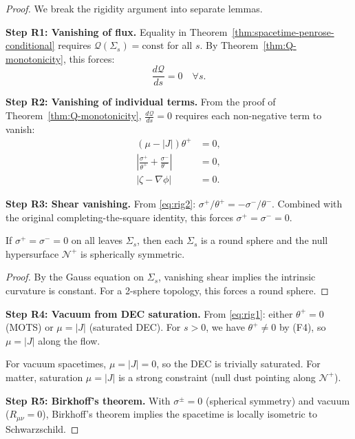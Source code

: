 \begin{proof}
We break the rigidity argument into separate lemmas.

\textbf{Step R1: Vanishing of flux.}
Equality in Theorem~\ref{thm:spacetime-penrose-conditional} requires $\mathcal{Q}(\Sigma_s) = \text{const}$ for all $s$. By Theorem~\ref{thm:Q-monotonicity}, this forces:
\begin{equation}
\frac{d\mathcal{Q}}{ds} = 0 \quad \forall s.
\end{equation}

\textbf{Step R2: Vanishing of individual terms.}
From the proof of Theorem~\ref{thm:Q-monotonicity}, $\frac{d\mathcal{Q}}{ds} = 0$ requires each non-negative term to vanish:
\begin{align}
(\mu - |J|)\theta^+ &= 0, \label{eq:rig1} \\
\left|\frac{\sigma^+}{\theta^+} + \frac{\sigma^-}{\theta^-}\right| &= 0, \label{eq:rig2} \\
|\zeta - \nabla\phi| &= 0. \label{eq:rig3}
\end{align}

\textbf{Step R3: Shear vanishing.}
From \eqref{eq:rig2}: $\sigma^+/\theta^+ = -\sigma^-/\theta^-$. Combined with the original completing-the-square identity, this forces $\sigma^+ = \sigma^- = 0$.

\begin{lemma}
\label{lem:shear-spherical}
If $\sigma^+ = \sigma^- = 0$ on all leaves $\Sigma_s$, then each $\Sigma_s$ is a round sphere and the null hypersurface $\mathcal{N}^+$ is spherically symmetric.
\end{lemma}

\begin{proof}
By the Gauss equation on $\Sigma_s$, vanishing shear implies the intrinsic curvature is constant. For a 2-sphere topology, this forces a round sphere.
\end{proof}

\textbf{Step R4: Vacuum from DEC saturation.}
From \eqref{eq:rig1}: either $\theta^+ = 0$ (MOTS) or $\mu = |J|$ (saturated DEC). For $s > 0$, we have $\theta^+ \neq 0$ by (F4), so $\mu = |J|$ along the flow. 

For vacuum spacetimes, $\mu = |J| = 0$, so the DEC is trivially saturated. For matter, saturation $\mu = |J|$ is a strong constraint (null dust pointing along $\mathcal{N}^+$).

\textbf{Step R5: Birkhoff's theorem.}
With $\sigma^\pm = 0$ (spherical symmetry) and vacuum ($R_{\mu\nu} = 0$), Birkhoff's theorem implies the spacetime is locally isometric to Schwarzschild.
\end{proof}

